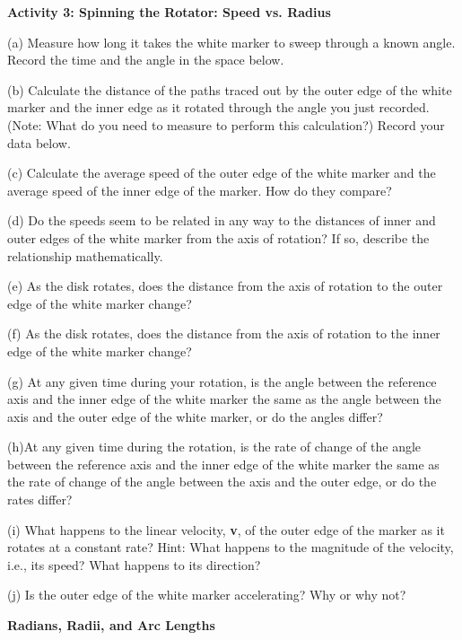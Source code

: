 \textbf{Activity 3: Spinning the Rotator: Speed vs. Radius} 

(a) Measure how long it takes the white marker to sweep through a known angle.
Record the time and the angle in the space below.
\answerspace{10mm}

(b) Calculate the distance of the paths traced out by the outer edge of the white marker and the inner edge as it rotated through the angle you just recorded.
(Note: What do you need to measure to perform this calculation?) Record your
data below.
\answerspace{20mm}

(c) Calculate the average speed of the outer edge of the white marker and the
average speed of the inner edge of the marker. How do they compare?
\answerspace{20mm}

(d) Do the speeds seem to be related in any way to the distances of inner and
outer edges of the white marker from the axis of rotation? If so, describe the
relationship mathematically.
\answerspace{18mm}

\pagebreak[2]
(e) As the disk rotates, does the distance from the axis of rotation to the outer edge of the white marker change?
\answerspace{10mm}

(f) As the disk rotates, does the distance from the axis of rotation to the inner edge of the white marker change?
\vspace{10mm}

(g) At any given time during your rotation, is the angle between the reference
axis and the inner edge of the white marker the same as the angle between the
axis and the outer edge of the white marker, or do the angles differ?
\vspace{10mm}

(h)At any given time during the rotation, is the rate of change of the angle
between the reference axis and the inner edge of the white marker the same as
the rate of change of the angle between the axis and the outer edge, or do the
rates differ?
\vspace{10mm}

(i) What happens to the linear velocity, \textbf{v}, of the outer edge of the
marker as it rotates at a constant rate? Hint: What happens to the magnitude
of the velocity, i.e., its speed? What happens to its direction?
\vspace{20mm}

(j) Is the outer edge of the white marker accelerating? Why or why not?
\vspace{20mm}

\textbf{Radians, Radii, and Arc Lengths} 

